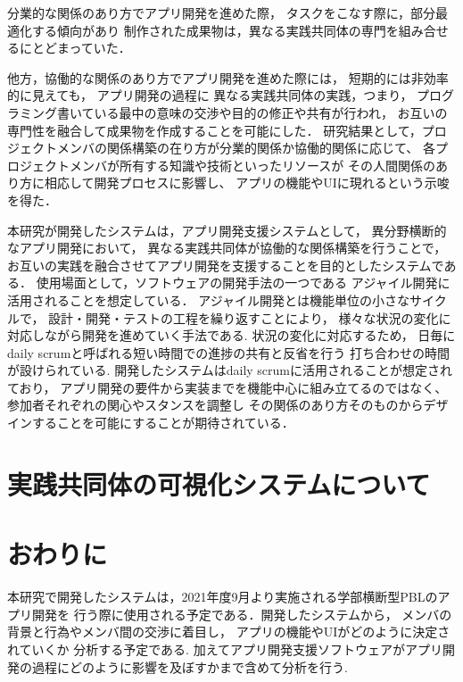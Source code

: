 \documentclass[twoside]{wiss}
\begin{document}
分業的な関係のあり方でアプリ開発を進めた際，
タスクをこなす際に，部分最適化する傾向があり
制作された成果物は，異なる実践共同体の専門を組み合せるにとどまっていた．

他方，協働的な関係のあり方でアプリ開発を進めた際には，
短期的には非効率的に見えても，
アプリ開発の過程に
異なる実践共同体の実践，つまり，
プログラミング書いている最中の意味の交渉や目的の修正や共有が行われ，
お互いの専門性を融合して成果物を作成することを可能にした．
研究結果として，プロジェクトメンバの関係構築の在り方が分業的関係か協働的関係に応じて、
各プロジェクトメンバが所有する知識や技術といったリソースが
その人間関係のあり方に相応して開発プロセスに影響し、
アプリの機能やUIに現れるという示唆を得た．


本研究が開発したシステムは，アプリ開発支援システムとして，
異分野横断的なアプリ開発において，
異なる実践共同体が協働的な関係構築を行うことで，
お互いの実践を融合させてアプリ開発を支援することを目的としたシステムである．
使用場面として，ソフトウェアの開発手法の一つである
アジャイル開発に活用されることを想定している．
アジャイル開発とは機能単位の小さなサイクルで，
設計・開発・テストの工程を繰り返すことにより，
様々な状況の変化に対応しながら開発を進めていく手法である.
状況の変化に対応するため，
日毎にdaily scrumと呼ばれる短い時間での進捗の共有と反省を行う
打ち合わせの時間が設けられている.
開発したシステムはdaily scrumに活用されることが想定されており，
アプリ開発の要件から実装までを機能中心に組み立てるのではなく、
参加者それぞれの関心やスタンスを調整し
その関係のあり方そのものからデザインすることを可能にすることが期待されている．



\section{実践共同体の可視化システムについて}
\label{system}


\section{おわりに}

本研究で開発したシステムは，2021年度9月より実施される学部横断型PBLのアプリ開発を
行う際に使用される予定である．開発したシステムから，
メンバの背景と行為やメンバ間の交渉に着目し，
アプリの機能やUIがどのように決定されていくか 分析する予定である.
加えてアプリ開発支援ソフトウェアがアプリ開発の過程にどのように影響を及ぼすかまで含めて分析を行う.
\end{document}
